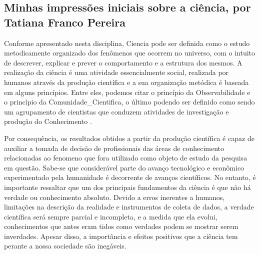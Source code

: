 \subsection{Minhas impressões iniciais sobre a ciência, por Tatiana Franco Pereira}

Conforme apresentado nesta disciplina, \gls{Ciencia} pode ser definida como o estudo metodicamente organizado dos fenômenos que ocorrem no universo, com o intuito de descrever, explicar e prever o comportamento e a estrutura dos mesmos.  A realização da ciência é uma atividade essencialmente social, realizada por humanos através da produção científica e a sua organização metódica é baseada em alguns princípios. Entre eles, podemos citar o princípio da \gls{Observabilidade} e o princípio da \gls{Comunidade_Cientifica}, o último podendo ser definido como sendo um agrupamento de cientistas que conduzem atividades de investigação e produção do \gls{Conhecimento} \citep{wikipedia_ciencia_2022}. 

Por consequência, os resultados obtidos a partir da produção científica é capaz de auxiliar a tomada de decisão de profissionais das áreas de conhecimento relacionadas ao \gls{fenomeno} que fora utilizado como objeto de estudo da pesquisa em questão. Sabe-se que considerável parte do avanço tecnológico e econômico experimentado pela humanidade é decorrente de avanços científicos. No entanto, é importante ressaltar que um dos principais fundamentos da ciência é que não há verdade ou conhecimento absoluto. Devido a erros inerentes a humanos, limitações na descrição da realidade e instrumentos de coleta de dados, a verdade científica será sempre parcial e incompleta, e a medida que ela evolui, conhecimentos que antes eram tidos como verdades podem  se mostrar serem inverdades.  Apesar disso, a importância e efeitos positivos que a ciência tem perante a nossa sociedade são inegáveis.